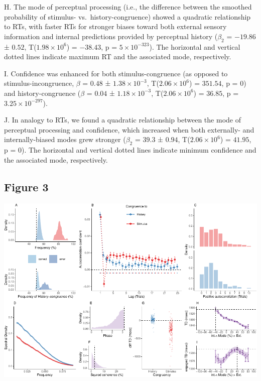 \documentclass[
]{article}
\begin{document}
H. The mode of perceptual processing (i.e., the difference between the
smoothed probability of stimulus- vs.~history-congruence) showed a
quadratic relationship to RTs, with faster RTs for stronger biases
toward both external sensory information and internal predictions
provided by perceptual history (\(\beta_2\) = \(-19.86\) ± \(0.52\),
T(\(\ensuremath{1.98\times 10^{6}}\)) = \(-38.43\), p =
\(\ensuremath{5\times 10^{-323}}\)). The horizontal and vertical dotted
lines indicate maximum RT and the associated mode, respectively.

I. Confidence was enhanced for both stimulus-congruence (as opposed to
stimulus-incongruence, \(\beta\) = \(0.48\) ±
\(\ensuremath{1.38\times 10^{-3}}\),
T(\(\ensuremath{2.06\times 10^{6}}\)) = \(351.54\), p = \(0\)) and
history-congruence (\(\beta\) = \(0.04\) ±
\(\ensuremath{1.18\times 10^{-3}}\),
T(\(\ensuremath{2.06\times 10^{6}}\)) = \(36.85\), p =
\(\ensuremath{3.25\times 10^{-297}}\)).

J. In analogy to RTs, we found a quadratic relationship between the mode
of perceptual processing and confidence, which increased when both
externally- and internally-biased modes grew stronger (\(\beta_2\) =
\(39.3\) ± \(0.94\), T(\(\ensuremath{2.06\times 10^{6}}\)) = \(41.95\),
p = \(0\)). The horizontal and vertical dotted lines indicate minimum
confidence and the associated mode, respectively.

\newpage

\hypertarget{figure-3}{%
\subsection{Figure 3}\label{figure-3}}

\includegraphics{modes_mouse_rev2_files/figure-latex/Figure_3-1.pdf}
\end{document}
